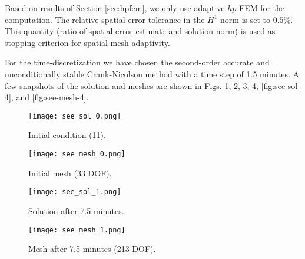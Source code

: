 \documentclass[final,3p,times,twocolumn]{elsarticle}
\begin{document}
Based on results of Section \ref{sec:hpfem}, we only use adaptive $hp$-FEM
for the computation. The relative spatial error tolerance in the $H^1$-norm
is set to $0.5 \%$. This quantity (ratio of spatial error estimate and 
solution norm) is used as stopping criterion for spatial mesh adaptivity.

For the time-discretization we have chosen the second-order accurate 
and unconditionally stable Crank-Nicolson method with a 
time step of 1.5 minutes. A few snapshots of the solution and meshes 
are shown in Figs. \ref{fig:see-sol-0}, \ref{fig:see-mesh-0}, \ref{fig:see-sol-1}, \ref{fig:see-mesh-1}, \ref{fig:see-sol-4}, and \ref{fig:see-mesh-4}.

\begin{figure}[!ht]
\begin{center}
\vspace{-1mm}
\hspace{-0mm}
\texttt{[image: see\_sol\_0.png]}
\end{center}
\vspace{-6mm}
\caption{Initial condition (11).}
\label{fig:see-sol-0}
\end{figure}

\begin{figure}[!ht]
\begin{center}
\vspace{-2mm}
\hspace{6mm}
\texttt{[image: see\_mesh\_0.png]}
\end{center}
\vspace{-6mm}
\caption{Initial mesh (33 DOF).}
\label{fig:see-mesh-0}
\end{figure}

\begin{figure}[!ht]
\begin{center}
\vspace{-3mm}
\texttt{[image: see\_sol\_1.png]}
\end{center}
\vspace{-6mm}
\caption{Solution after 7.5 minutes.}
\label{fig:see-sol-1}
\end{figure}

\begin{figure}[!ht]
\begin{center}
\hspace{6mm}
\texttt{[image: see\_mesh\_1.png]}
\end{center}
\vspace{-6mm}
\caption{Mesh after 7.5 minutes (213 DOF).}
\label{fig:see-mesh-1}
\end{figure}
\end{document}
